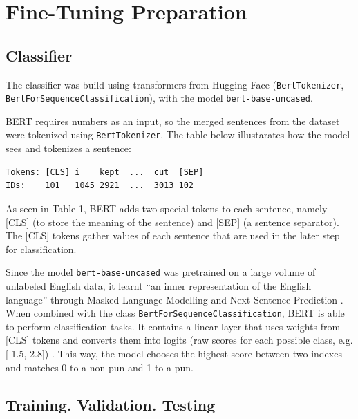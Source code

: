 \documentclass[11pt,a4paper]{article}
\begin{document}
\section{Fine-Tuning Preparation}
\subsection{Classifier}

The classifier was build using transformers from Hugging Face (\texttt{BertTokenizer}, \texttt{BertForSequenceClassification}), with the model \texttt{bert-base-uncased}. 

BERT requires numbers as an input, so the merged sentences from the dataset were tokenized using \texttt{BertTokenizer}. The table below illustarates how the model sees and tokenizes a sentence: 

\begin{table}[h]
\centering
\label{tab:bert_tokens}
\begin{small}
\begin{verbatim}
Tokens: [CLS] i    kept  ...  cut  [SEP]
IDs:    101   1045 2921  ...  3013 102
\end{verbatim}
\caption{BERT Input Representation}
\end{small}
\end{table}

As seen in Table 1, BERT adds two special tokens to each sentence, namely [CLS] (to store the meaning of the sentence) and [SEP] (a sentence separator). The [CLS] tokens gather values of each sentence that are used in the later step for classification.

Since the model \texttt{bert-base-uncased} was pretrained on a large volume of unlabeled English data, it learnt “an inner representation of the English language” through Masked Language Modelling and Next Sentence Prediction \citep{hugginface_bert_uncased}. When combined with the class \texttt{BertForSequenceClassification}, BERT is able to perform classification tasks. It contains a linear layer that uses weights from [CLS] tokens and converts them into logits (raw scores for each possible class, e.g.[-1.5, 2.8]) \citep{hugginface_course}. This way, the model chooses the highest score between two indexes and matches 0 to a non-pun and 1 to a pun. 

\subsection{Training. Validation. Testing}
\end{document}
